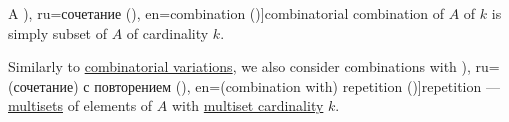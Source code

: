 \begin{definition}\label{def:combinatorial_combination}\mimprovised
  A \term[bg=комбинация (\cite[27]{ДимитровЯнев2007ВероятностиИСтатистика}), ru=сочетание (\cite[172]{Яблонский2003ДискретнаяМатематика}), en=combination (\cite[431]{Rosen2019DiscreteMathematics})]{combinatorial combination} of \( A \) of  \( k \) is simply subset of \( A \) of cardinality \( k \).

  Similarly to \hyperref[def:combinatorial_variation]{combinatorial variations}, we also consider combinations with \term[bg=(комбинация с) повторение (\cite[28]{ДимитровЯнев2007ВероятностиИСтатистика}), ru=(сочетание) с повторением (\cite[172]{Яблонский2003ДискретнаяМатематика}), en=(combination with) repetition (\cite[446]{Rosen2019DiscreteMathematics})]{repetition} --- \hyperref[def:multiset]{multisets} of elements of \( A \) with \hyperref[def:multiset_cardinality]{multiset cardinality} \( k \).
\end{definition}

